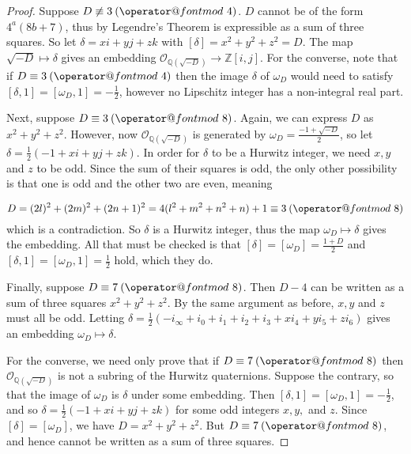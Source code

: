 \documentclass[10pt]{amsart}
\makeatletter
\newcommand{\Q}{\mathbb{Q}}
\newcommand{\Z}{\mathbb{Z}}
\newcommand{\omd}{\omega_{\scriptscriptstyle D}}
\newcommand{\thering}{\mathcal{O}_{\Q(\sqrt{-D})}}
\newcommand{\norm}[1]{\left[#1\right]}
\DeclareRobustCommand{\pmod}{\@pmods}
\def\@pmods#1{\mkern4mu({\operator@font mod}\mkern 6mu#1)}
\makeatother
\begin{document}
\begin{proof}
Suppose $D \not \equiv 3 \pmod{4}$.  $D$ cannot be of the form $4^a (8b+7)$, thus by Legendre's Theorem is expressible as a sum of three squares.  So let $\delta = xi + yj + zk$ with $\norm{\delta} = x^2 + y^2 + z^2 = D$.  The map $\sqrt{-D} \mapsto \delta$ gives an embedding $\thering \rightarrow \Z[i,j]$.  For the converse, note that if $D \equiv 3 \pmod{4}$ then the image $\delta$ of $\omd$ would need to satisfy $\norm{\delta,1} = \norm{\omd,1} = -\frac12$, however no Lipschitz integer has a non-integral real part.

Next, suppose $D \equiv 3 \pmod{8}$.  Again, we can express $D$ as $x^2 + y^2 + z^2$.  However, now $\thering$ is generated by $\omd = \frac{-1 + \sqrt{-D}}{2}$, so let $\delta = \frac12 (-1 + xi + yj + zk)$.  In order for $\delta$ to be a Hurwitz integer, we need $x,y$ and $z$ to be odd.  Since the sum of their squares is odd, the only other possibility is that one is odd and the other two are even, meaning

$$
D = (2l)^2 + (2m)^2 + (2n+1)^2 = 4(l^2 + m^2 + n^2 + n) + 1 \equiv 3 \pmod{8}
$$
which is a contradiction.  So $\delta$ is a Hurwitz integer, thus the map $\omd \mapsto \delta$ gives the embedding.  All that must be checked is that $\norm{\delta} = \norm{\omd} = \frac{1 + D}{2}$ and $\norm{\delta,1} = \norm{\omd,1} = \frac12$ hold, which they do.

Finally, suppose $D \equiv 7 \pmod{8}$.  Then $D-4$ can be written as a sum of three squares $x^2 + y^2 + z^2$.  By the same argument as before, $x,y$ and $z$ must all be odd.  Letting $\delta = \frac12( -i_\infty + i_0 + i_1 + i_2 + i_3 + xi_4 + yi_5 + zi_6)$ gives an embedding $\omd \mapsto \delta$.

For the converse, we need only prove that if $D \equiv 7 \pmod{8}$ then $\thering$ is not a subring of the Hurwitz quaternions.  Suppose the contrary, so that the image of $\omd$ is $\delta$ under some embedding.  Then $\norm{\delta, 1} = \norm{\omd, 1} = -\frac{1}{2}$, and so $\delta = \frac12 ( -1 + xi + yj + zk)$ for some odd integers $x,y,$ and $z$.  Since $\norm{\delta} = \norm{\omd}$, we have $D = x^2 +y^2 + z^2$.  But $D \equiv 7 \pmod{8}$, and hence cannot be written as a sum of three squares.
\end{proof}
\end{document}
